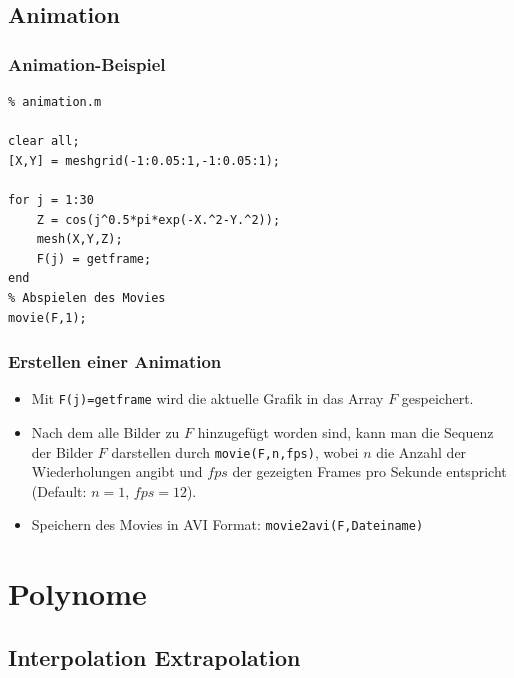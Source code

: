 \subsection{Animation}
% 
% 
\begin{frame}[fragile]\frametitle{Animation-Beispiel}
\begin{lstlisting}
% animation.m

clear all;
[X,Y] = meshgrid(-1:0.05:1,-1:0.05:1);

for j = 1:30
    Z = cos(j^0.5*pi*exp(-X.^2-Y.^2));
    mesh(X,Y,Z);
    F(j) = getframe;
end
% Abspielen des Movies
movie(F,1);
\end{lstlisting}
\end{frame}
%
% 
\begin{frame}[fragile]\frametitle{Erstellen einer Animation}
\begin{itemize}
\item Mit \lstinline!F(j)=getframe! wird die aktuelle Grafik in das Array
  $F$ gespeichert.
\item Nach dem alle Bilder zu $F$ hinzugefügt worden sind, kann man
  die Sequenz der Bilder $F$ darstellen durch \lstinline!movie(F,n,fps)!,
  wobei $n$ die Anzahl der Wiederholungen angibt und $fps$ der
  gezeigten Frames pro Sekunde entspricht (Default: $n=1$, $fps=12$). 

\item Speichern des Movies in AVI Format: \lstinline!movie2avi(F,Dateiname)!
\end{itemize}
\end{frame}

%
%
\section{Polynome}
\subsection{Interpolation Extrapolation}

